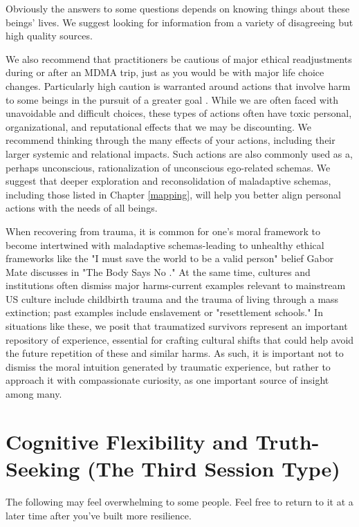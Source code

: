 \documentclass[12pt,letterpaper]{book}
\begin{document}
Obviously the answers to some questions depends on knowing things about these beings' lives. We suggest looking for information from a variety of disagreeing but high quality sources.

We also recommend that practitioners be cautious of major ethical readjustments during or after an MDMA trip, just as you would be with major life choice changes. Particularly high caution is warranted around actions that involve harm to some beings in the pursuit of a greater goal \cite{askellSelfServing}. While we are often faced with unavoidable and difficult choices, these types of actions often have toxic personal, organizational, and reputational effects that we may be discounting. We recommend thinking through the many effects of your actions, including their larger systemic and relational impacts. Such actions are also commonly used as a, perhaps unconscious, rationalization of unconscious ego-related schemas. We suggest that deeper exploration and reconsolidation of maladaptive schemas, including those listed in Chapter \ref{mapping}, will help you better align personal actions with the needs of all beings.

When recovering from trauma, it is common for one's moral framework to become intertwined with maladaptive schemas-leading to unhealthy ethical frameworks like the "I must save the world to be a valid person" belief Gabor Mate discusses in "The Body Says No \cite{mate2011body}." At the same time, cultures and institutions often dismiss major harms-current examples relevant to mainstream US culture include childbirth trauma and the trauma of living through a mass extinction; past examples include enslavement or "resettlement schools." In situations like these, we posit that traumatized survivors represent an important repository of experience, essential for crafting cultural shifts that could help avoid the future repetition of these and similar harms. As such, it is important not to dismiss the moral intuition generated by traumatic experience, but rather to approach it with compassionate curiosity, as one important source of insight among many.
\section{Cognitive Flexibility and Truth-Seeking (The Third Session Type)}
\label{cognitiveflexibility}
The following may feel overwhelming to some people. Feel free to return to it at a later time after you’ve built more resilience. 
\end{document}
